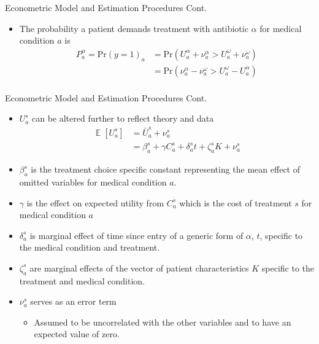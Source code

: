 \documentclass{beamer}
\DeclareMathOperator{\EX}{\mathbb{E}}
\begin{document}
\begin{frame}{Econometric Model and Estimation Procedures Cont.}
\begin{itemize}
\item The probability a patient demands treatment with antibiotic $\alpha$ for medical condition $a$ is
  \begin{equation}
  \begin{split}
      P_a^\alpha =\text{Pr}(y = 1)_a & = \text{Pr}(U_a^\alpha + \nu_a^\alpha > U_a^\omega + \nu_a^\omega)\\
      & = \text{Pr}(\nu_a^\alpha - \nu_a^\omega > U_a^\omega - U_a^\alpha)\\
  \end{split}
  \end{equation}
\end{itemize}  
\end{frame}

\begin{frame}{Econometric Model and Estimation Procedures Cont.}
\begin{itemize}
\item $U_a^s$ can be altered further to reflect theory and data
\begin{equation}
\begin{split}  \EX[U_a^s] & =\bar{U}_a^s + \nu_a^s\\
& = \beta_a^s + \gamma C_a^s + \delta_a^st + \zeta_a^sK + \nu_a^s
\end{split}
\end{equation}
\item $\beta_a^s$ is the treatment choice specific constant representing the mean effect of omitted variables for medical condition $a$.
\item $\gamma$ is the effect on expected utility from $C_a^s$ which is the cost of treatment $s$ for medical condition $a$
\item $\delta_a^s$ is marginal effect of time since entry of a generic form of $\alpha$, $t$, specific to the medical condition and treatment.
\item $\zeta_a^s$ are marginal effects of the vector of patient characteristics $K$ specific to the treatment and medical condition.
\item $\nu_a^s$ serves as an error term
\begin{itemize} 
  \item Assumed to be uncorrelated with the other variables and to have an expected value of zero.
\end{itemize}
\end{itemize}  
\end{frame}
\end{document}

